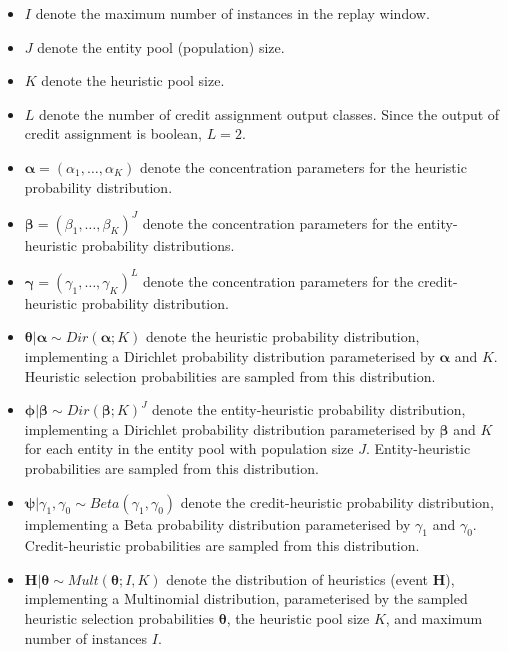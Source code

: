 \begin{itemize}
      \item $I$ denote the maximum number of instances in the replay window.
      \item $J$ denote the entity pool (population) size.
      \item $K$ denote the heuristic pool size.
      \item $L$ denote the number of credit assignment output classes. Since the output of credit assignment is boolean, $L = 2$.

      \item $\boldsymbol{\alpha} = (\alpha_{1}, \dots, \alpha_{K})$ denote the concentration parameters for the heuristic probability distribution.
      \item $\boldsymbol{\beta} = (\beta_{1}, \dots, \beta_{K})^{J}$ denote the concentration parameters for the entity-heuristic probability distributions.
      \item $\boldsymbol{\gamma} = (\gamma_{1}, \dots, \gamma_{K})^{L}$ denote the concentration parameters for the credit-heuristic probability distribution.

      \item $\boldsymbol{\theta} \vert \boldsymbol{\alpha} \sim Dir(\boldsymbol{\alpha}; K)$ denote the heuristic probability distribution, implementing a Dirichlet probability distribution parameterised by $\boldsymbol{\alpha}$ and $K$. Heuristic selection probabilities are sampled from this distribution.

      \item $\boldsymbol{\phi} \vert \boldsymbol{\beta} \sim Dir(\boldsymbol{\beta}; K)^{J}$ denote the entity-heuristic probability distribution, implementing a Dirichlet probability distribution parameterised by $\boldsymbol{\beta}$ and $K$ for each entity in the entity pool with population size $J$. Entity-heuristic probabilities are sampled from this distribution.

      \item $\boldsymbol{\psi} \vert \gamma_{1}, \gamma_{0}  \sim Beta(\gamma_{1}, \gamma_{0})$ denote the credit-heuristic probability distribution, implementing a Beta probability distribution parameterised by $\gamma_{1}$ and $\gamma_{0}$. Credit-heuristic probabilities are sampled from this distribution.

      \item $\boldsymbol{H} \vert \boldsymbol{\theta} \sim Mult(\boldsymbol{\theta}; I, K)$ denote the distribution of heuristics (event $\boldsymbol{H}$), implementing a Multinomial distribution, parameterised by the sampled heuristic selection probabilities $\boldsymbol{\theta}$, the heuristic pool size $K$, and maximum number of instances $I$.


\end{itemize}
